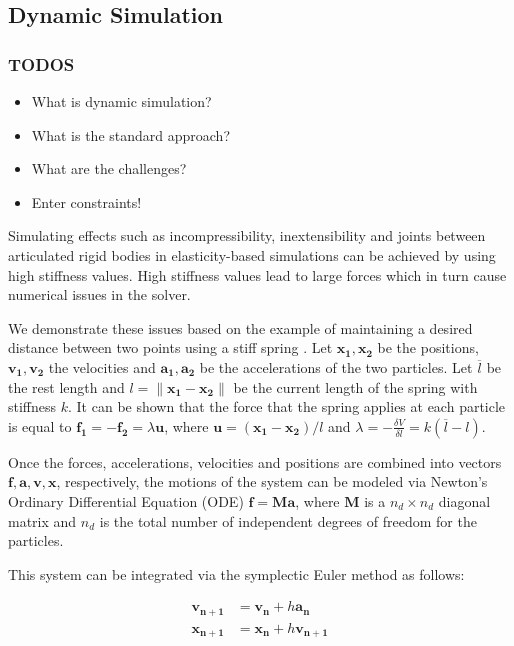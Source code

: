 \documentclass{article}
\begin{document}
\subsection*{Dynamic Simulation}
\subsubsection*{TODOS}
\begin{itemize}
    \item What is dynamic simulation?
    \item What is the standard approach?
    \item What are the challenges?
    \item Enter constraints!
\end{itemize}

Simulating effects such as incompressibility, inextensibility and joints between articulated rigid bodies 
in elasticity-based simulations can be achieved by using high stiffness values. High stiffness values lead to 
large forces which in turn cause numerical issues in the solver. 

We demonstrate these issues based on the example of maintaining a desired distance between two points using a stiff 
spring \cite{tournier2015}. Let $\bm{x_1, x_2}$ be the positions, $\bm{v_1, v_2}$ the velocities and $\bm{a_1, a_2}$
be the accelerations of the two particles. Let $\overline{l}$ be the rest length and $l = \lVert \bm{x_1} - \bm{x_2} \rVert$ 
be the current length of the spring with stiffness $k$. It can be shown that the force that the spring applies at each particle
is equal to $\bm{f_1} = -\bm{f_2} = \lambda\bm{u}$, where $\bm{u} = (\bm{x_1} - \bm{x_2}) / l$
and $\lambda = -\frac{\delta V}{\delta l} = k(\overline{l} - l)$. 

Once the forces, accelerations, velocities and positions are combined into vectors $\bm{f}, \bm{a}, \bm{v}, \bm{x}$, 
respectively, the motions of the system can be modeled via Newton's Ordinary Differential Equation (ODE) $\bm{f} = \bm{Ma}$,
where $\bm{M}$ is a $n_d \times n_d$ diagonal matrix and $n_d$ is the total number of independent degrees of freedom for the 
particles.

This system can be integrated via the symplectic Euler method as follows:

\begin{align*}
    \bm{v_{n+1}} &= \bm{v_n} + h\bm{a_n} \\
    \bm{x_{n+1}} &= \bm{x_n} + h\bm{v_{n+1}}
\end{align*}
\end{document}
